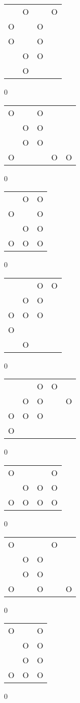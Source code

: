 \begin{tabular}{|m{0.2cm}m{0.2cm}m{0.2cm}m{0.2cm}|}\hline
 &O& &O\\
O& &O& \\
O& &O& \\
 &O&O& \\
 &O& & \\
\hline\end{tabular}0
\begin{tabular}{|m{0.2cm}m{0.2cm}m{0.2cm}m{0.2cm}m{0.2cm}|}\hline
O& &O& & \\
 &O&O& & \\
 &O&O& & \\
O& & &O&O\\
\hline\end{tabular}0
\begin{tabular}{|m{0.2cm}m{0.2cm}m{0.2cm}|}\hline
 &O&O\\
O& &O\\
 &O&O\\
O&O&O\\
\hline\end{tabular}0
\begin{tabular}{|m{0.2cm}m{0.2cm}m{0.2cm}m{0.2cm}|}\hline
 & &O&O\\
 &O&O& \\
O&O&O& \\
O& & & \\
 &O& & \\
\hline\end{tabular}0
\begin{tabular}{|m{0.2cm}m{0.2cm}m{0.2cm}m{0.2cm}m{0.2cm}|}\hline
 & &O&O& \\
 &O&O& &O\\
O&O&O& & \\
O& & & & \\
\hline\end{tabular}0
\begin{tabular}{|m{0.2cm}m{0.2cm}m{0.2cm}m{0.2cm}|}\hline
O& & &O\\
 &O&O&O\\
O&O&O&O\\
\hline\end{tabular}0
\begin{tabular}{|m{0.2cm}m{0.2cm}m{0.2cm}m{0.2cm}m{0.2cm}|}\hline
O& & &O& \\
 &O&O& & \\
 &O&O& & \\
O& &O& &O\\
\hline\end{tabular}0
\begin{tabular}{|m{0.2cm}m{0.2cm}m{0.2cm}|}\hline
O& &O\\
 &O&O\\
 &O&O\\
O&O&O\\
\hline\end{tabular}0
